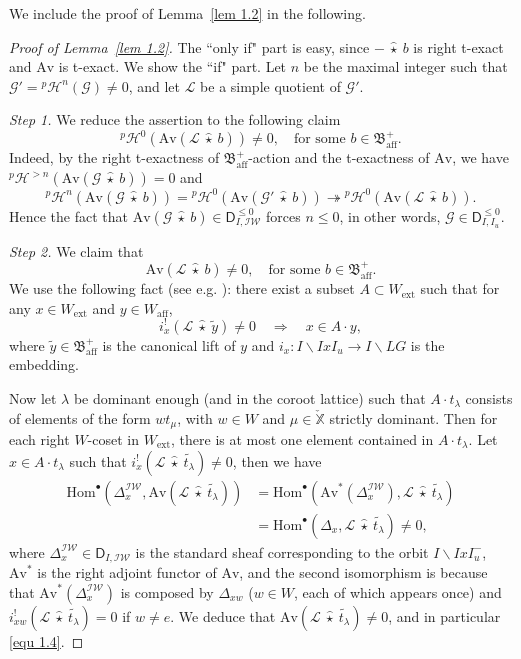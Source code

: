 \documentclass[11pt]{amsart}
\numberwithin{equation}{section}
\theoremstyle{plain}
\theoremstyle{definition}
\newcommand{\D}{{\mathsf D}}
\newcommand{\sG}{{\mathcal G}}
\newcommand{\sH}{{\mathcal H}}
\newcommand{\sL}{{\mathcal L}}
\newcommand{\X}{{\mathbb X}}
\newcommand{\Xd}{\check{\X}}
\newcommand{\Hom}{\mathrm{Hom}}
\newcommand{\Av}{\mathrm{Av}}
\newcommand{\IW}{\mathcal{IW}}
\newcommand{\ex}{\mathrm{ext}}
\newcommand{\af}{\mathrm{aff}}
\begin{document}
We include the proof of Lemma~\ref{lem 1.2} in the following. 
\begin{proof}[Proof of Lemma~\ref{lem 1.2}]
The ``only if" part is easy, since $-\ \widehat{\star}\ b$ is right t-exact and $\Av$ is t-exact. 
We show the ``if" part. 
Let $n$ be the maximal integer such that $\sG'={}^p\sH^n(\sG)\neq 0$, and let $\sL$ be a simple quotient of $\sG'$. 

\textit{Step 1.} 
We reduce the assertion to the following claim 
\begin{equation}
{}^p\sH^0(\Av(\sL\ \widehat{\star}\ b))\neq 0, \quad \text{for some } b\in \mathfrak{B}_\af^+. 
\end{equation}
Indeed, by the right t-exactness of $\mathfrak{B}_\af^+$-action and the t-exactness of $\Av$, we have ${}^p\sH^{>n}(\Av(\sG\ \widehat{\star}\ b))=0$ and 
\[
{}^p\sH^n(\Av(\sG\ \widehat{\star}\ b))={}^p\sH^0(\Av(\sG'\ \widehat{\star}\ b)) \twoheadrightarrow {}^p\sH^0(\Av(\sL\ \widehat{\star}\ b)). 
\]
Hence the fact that $\Av(\sG\ \widehat{\star}\ b)\in \D^{\leq 0}_{I,\IW}$ forces $n\leq 0$, in other words, $\sG\in \D^{\leq 0}_{I,I_u}$. 

\textit{Step 2.} 
We claim that  
\begin{equation}\label{equ 1.4}
\Av(\sL\ \widehat{\star}\ b)\neq 0, \quad \text{for some } b\in \mathfrak{B}_\af^+. 
\end{equation}
We use the following fact (see e.g. \cite[Prop 4.4.4]{ARbook}): there exist a subset $A\subset W_\ex$ such that for any $x\in W_\ex$ and $y\in W_\af$, 
\[
i^!_x(\sL \ \widehat{\star}\ \widetilde{y}) \neq 0 \quad \Rightarrow \quad x\in A\cdot y,
\]
where $\widetilde{y}\in \mathfrak{B}^+_\af$ is the canonical lift of $y$ and $i_x:I\backslash I xI_u\rightarrow I\backslash LG$ is the embedding. 

Now let $\lambda$ be dominant enough (and in the coroot lattice) such that $A\cdot t_\lambda$ consists of elements of the form $wt_\mu$, with $w\in W$ and $\mu\in \Xd$ strictly dominant. 
Then for each right $W$-coset in $W_\ex$, there is at most one element contained in $A\cdot t_\lambda$. 
Let $x\in A\cdot t_\lambda$ such that $i^!_x(\sL \ \widehat{\star}\ \widetilde{t_\lambda}) \neq 0$, then we have 
\begin{align*}
\Hom^\bullet(\Delta^{\IW}_x, \Av(\sL \ \widehat{\star}\ \widetilde{t_\lambda}))
&= \Hom^\bullet(\Av^*(\Delta^{\IW}_x), \sL \ \widehat{\star}\ \widetilde{t_\lambda})\\
&= \Hom^\bullet(\Delta_x, \sL \ \widehat{\star}\ \widetilde{t_\lambda})\neq 0,
\end{align*}
where $\Delta^{\IW}_x\in \D_{I,\IW}$ is the standard sheaf corresponding to the orbit $I\backslash IxI_u^-$, $\Av^*$ is the right adjoint functor of $\Av$, and the second isomorphism is because that $\Av^*(\Delta^{\IW}_x)$ is composed by $\Delta_{xw}$ ($w\in W$, each of which appears once) and $i^!_{xw}(\sL \ \widehat{\star}\ \widetilde{t_\lambda}) = 0$ if $w\neq e$. 
We deduce that $\Av(\sL \ \widehat{\star}\ \widetilde{t_\lambda}) \neq 0$, and in particular \eqref{equ 1.4}. 


\end{proof}
\end{document}
